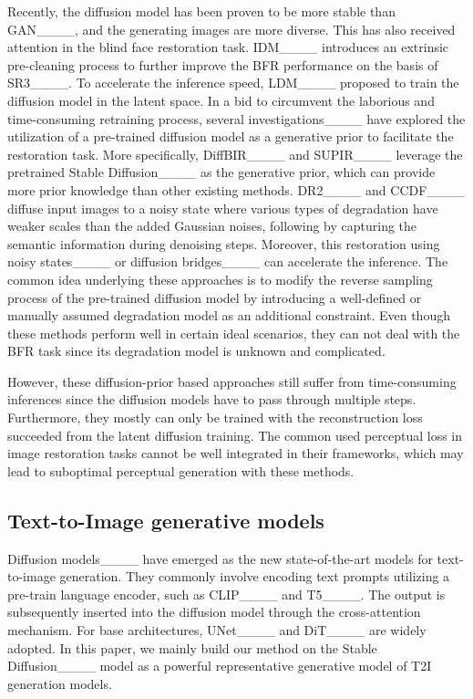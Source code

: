 \vspace{-1mm}
Recently, the diffusion model has been proven to be more
stable than GAN____, and the generating images are more diverse. This has also received attention in the blind face restoration task.
IDM____ introduces an extrinsic pre-cleaning process to further improve the BFR performance on the basis of SR3____.
To accelerate the inference speed, LDM____ proposed to train the diffusion model in the latent space. In a bid to circumvent the laborious and time-consuming retraining process, several investigations____ have explored the utilization of a pre-trained diffusion model as a generative prior to facilitate the restoration task.
More specifically, 
DiffBIR____ and SUPIR____ leverage the pretrained Stable Diffusion____ as the generative prior, which can provide more prior knowledge than other existing methods.
DR2____ and CCDF____ diffuse input images to a noisy state where various types of degradation have weaker scales than the added Gaussian noises, following by capturing the semantic information during denoising steps. 
Moreover, this restoration using noisy states____ or diffusion bridges____ can accelerate the inference. 
The common idea underlying these approaches is to modify the reverse sampling process of the pre-trained diffusion model by introducing a well-defined or manually assumed degradation model as an additional constraint. Even though these methods perform well in certain ideal scenarios, they can not deal with the BFR task since its degradation model is unknown and complicated. 

However, these diffusion-prior based approaches still suffer from time-consuming inferences since the diffusion models have to pass through multiple steps. Furthermore, they mostly can only be trained with the reconstruction loss succeeded from the latent diffusion training. The common used perceptual loss in image restoration tasks cannot be well integrated in their frameworks, which may lead to suboptimal perceptual generation with these methods.


\vspace{-2mm}
\subsection{Text-to-Image generative models}
Diffusion models____ have emerged as the new state-of-the-art models for text-to-image generation. They commonly involve encoding text prompts utilizing a pre-train language encoder, such as CLIP____ and T5____.
The output is subsequently inserted into the diffusion model through the cross-attention mechanism. For base architectures, UNet____ and DiT____ are widely adopted.
In this paper, we mainly build our method on the Stable Diffusion____ model as a powerful representative generative model of T2I generation models.


